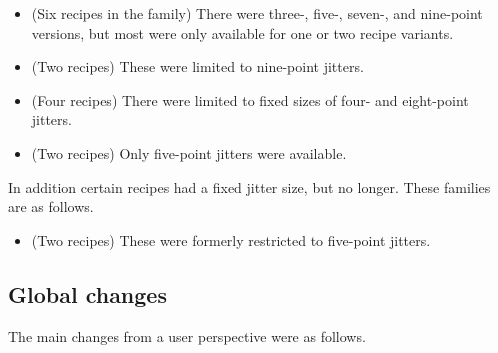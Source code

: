 \documentclass[twoside,11pt,nolof]{starlink}
\begin{document}
\begin{itemize}
    \item {}
          (Six recipes in the family)  There were three-,
          five-, seven-, and nine-point versions, but most were only
          available for one or two recipe variants.
    \item {}
          (Two recipes)  These were limited to nine-point jitters.
    \item {}
          (Four recipes) There were limited to fixed sizes of four- and
          eight-point jitters.
    \item {} (Two recipes)
          Only five-point jitters were available.
\end{itemize}

In addition certain recipes had a fixed jitter size, but no longer.
These families are as follows.

\begin{itemize}
    \item {} (Two recipes)
       These were formerly restricted to five-point jitters.
\end{itemize}

\subsection{Global changes}

The main changes from a user perspective were as follows.
\end{document}
